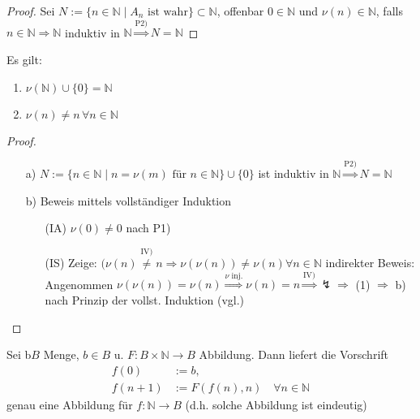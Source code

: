 \begin{proof}
	Sei $N := \{n \in \mathbb{N} \mid A_n \text{ ist wahr}\} \subset \mathbb{N}$, offenbar $0 \in \mathbb{N}$ und $\nu(n) \in \mathbb{N}$, falls $n \in \mathbb{N} \Rightarrow \mathbb{N}$ induktiv in $\mathbb{N} \overset{\text{P2)}}{\Rightarrow} N = \mathbb{N}$
\end{proof}

\begin{lemma}
	Es gilt:
	\begin{enumerate}[label={\alph*)}]
		\item $\nu(\mathbb{N})\cup \{0\}=\mathbb{N}$
		\item $\nu(n)\neq n\,\forall n\in\mathbb{N}$
	\end{enumerate}
\end{lemma}

\begin{proof}
	\begin{itemize}
		\item[a)] $N := \{n \in \mathbb{N} \mid n = \nu(m) \text{ für } n\in \mathbb{N} \} \cup \{ 0 \}$ ist induktiv in $\mathbb{N} \overset{\text{P2)}}{\Rightarrow} N = \mathbb{N}$
		\item[b)] Beweis mittels vollständiger Induktion
		\begin{itemize}
			\item[(IA)] $\nu(0) \neq 0$ nach P1)
			\item[(IS)] Zeige: $(\nu(n) \overset{\text{IV)}}{\neq} n \Rightarrow \nu(\nu(n)) \neq \nu(n) \forall n \in \mathbb{N}$
		indirekter Beweis: \\
		Angenommen $\nu(\nu(n)) = \nu(n) \overset{\nu \text{ inj.}}{\Rightarrow} \nu(n) = n \overset{\text{IV)}}{\Rightarrow} \lightning \Rightarrow$ (1) $\Rightarrow$ b) nach Prinzip der vollst. Induktion (vgl.)
		\end{itemize}
	\end{itemize}
\end{proof}

\begin{proposition}
	Sei b$B$ Menge, $b\in B$ u. $F:B\times\mathbb{N}\rightarrow B$ Abbildung. Dann liefert die Vorschrift \begin{align}\label{rekur_definition}
		f(0) &:= b,\\f(n+1)&:=F(f(n),n)\quad\forall n\in \mathbb{N}
	\end{align}
	genau eine Abbildung für $f:\mathbb{N}\rightarrow B$ (d.h. solche Abbildung ist eindeutig)
\end{proposition}

